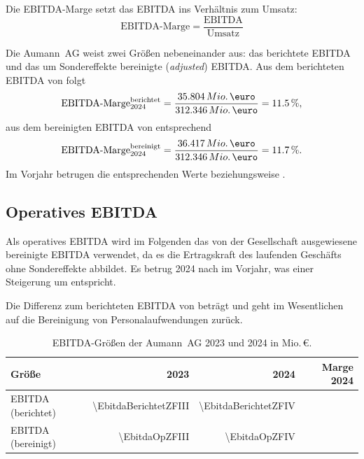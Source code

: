Die EBITDA-Marge setzt das EBITDA ins Verh\"altnis zum Umsatz:
\begin{equation}
\label{eq:ebitda-marge}
\text{EBITDA-Marge} = \frac{\text{EBITDA}}{\text{Umsatz}}
\end{equation}

Die Aumann~AG weist zwei Gr\"o{\ss}en nebeneinander aus: das berichtete EBITDA
und das um Sondereffekte bereinigte (\emph{adjusted}) EBITDA.
Aus dem berichteten EBITDA von \MioEUR{\EbitdaBerichtetZFIV} folgt
\[
\text{EBITDA-Marge}_{2024}^{\text{berichtet}}
= \frac{\MioEURexakt{\EbitdaBerichtetZFIV}}{\MioEURexakt{\UmsatzZFIV}}
= \Pct{\EbitdaMargeBerichtetZFIV},
\]
aus dem bereinigten EBITDA von \MioEUR{\EbitdaOpZFIV} entsprechend
\[
\text{EBITDA-Marge}_{2024}^{\text{bereinigt}}
= \frac{\MioEURexakt{\EbitdaOpZFIV}}{\MioEURexakt{\UmsatzZFIV}}
= \Pct{\EbitdaMargeZFIV}.
\]
Im Vorjahr betrugen die entsprechenden Werte
\Pct{\EbitdaMargeBerichtetZFIII} beziehungsweise
\Pct{\EbitdaMargeZFIII}.

\subsection{Operatives EBITDA}
\label{subsec:ebitda-operativ}

Als operatives EBITDA wird im Folgenden das von der Gesellschaft
ausgewiesene bereinigte EBITDA verwendet, da es die Ertragskraft des
laufenden Gesch\"afts ohne Sondereffekte abbildet. Es betrug 2024
\MioEUR{\EbitdaOpZFIV} nach \MioEUR{\EbitdaOpZFIII} im Vorjahr, was einer
Steigerung um \Pct{\EbitdaOpDeltaZFIV} entspricht.

Die Differenz zum berichteten EBITDA von \MioEUR{\EbitdaBerichtetZFIV}
betr\"agt \MioEURexakt{\BereinigungsbetragZFIV} und geht im Wesentlichen auf
die Bereinigung von Personalaufwendungen zur\"uck.

\begin{table}[htbp]
\centering
\caption{EBITDA-Gr\"o{\ss}en der Aumann~AG 2023 und 2024 in Mio.\,\euro.}
\label{tab:ebitda-vergleich}
\begin{tabular}{@{}lrrr@{}}
\toprule
\textbf{Gr\"o{\ss}e} & \textbf{2023} & \textbf{2024} & \textbf{Marge 2024}\\
\midrule
EBITDA (berichtet)  & \num{\EbitdaBerichtetZFIII} & \num{\EbitdaBerichtetZFIV}
                    & \Pct{\EbitdaMargeBerichtetZFIV}\\
EBITDA (bereinigt)  & \num{\EbitdaOpZFIII}        & \num{\EbitdaOpZFIV}
                    & \Pct{\EbitdaMargeZFIV}\\
\bottomrule
\end{tabular}
\end{table}

